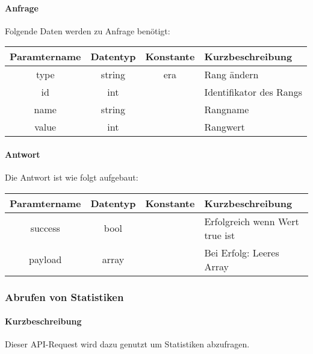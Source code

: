 \paragraph{Anfrage}Folgende Daten werden zu Anfrage benötigt:
\begin{table}[H]
	\begin{tabular}{|c|c|c|p{6.5cm}|}
		\hline
		\textbf{Paramtername} & \textbf{Datentyp} & \textbf{Konstante} & \textbf{Kurzbeschreibung}                                                                                               \\ \hline
		type                & string            & era                & Rang ändern \\ \hline
		id                  & int               &                    & Identifikator des Rangs \\ \hline
		name                & string            &                    & Rangname \\ \hline
		value               & int               &                    & Rangwert \\ \hline
	\end{tabular}
\end{table}
\paragraph{Antwort}Die Antwort ist wie folgt aufgebaut:
\begin{table}[H]
	\begin{tabular}{|c|c|c|p{6.5cm}|}
		\hline
		\textbf{Paramtername} & \textbf{Datentyp} & \textbf{Konstante} & \textbf{Kurzbeschreibung}            \\ \hline                
		success             & bool             &                 & Erfolgreich wenn Wert {\glqq true\grqq} ist \\ \hline
		payload             & array            &                 & Bei Erfolg: Leeres Array \\ \hline
	\end{tabular}
\end{table}
\subsubsection{Abrufen von Statistiken}
\paragraph{Kurzbeschreibung}Dieser API-Request wird dazu genutzt um Statistiken abzufragen.
